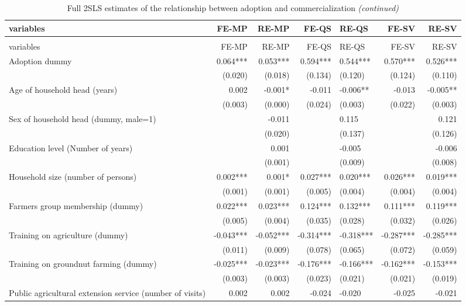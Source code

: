 \documentclass[
]{article}
\begin{document}
\begin{longtable}[t]{lrrrlrr}
\caption{\label{tab:unnamed-chunk-8}Full 2SLS estimates of the relationship between adoption and commercialization}\\
\toprule
variables & FE-MP & RE-MP & FE-QS & RE-QS & FE-SV & RE-SV\\
\midrule
\endfirsthead
\caption[]{\label{tab:unnamed-chunk-8}Full 2SLS estimates of the relationship between adoption and commercialization \textit{(continued)}}\\
\toprule
variables & FE-MP & RE-MP & FE-QS & RE-QS & FE-SV & RE-SV\\
\midrule
\endhead

\endfoot
\bottomrule
\endlastfoot
Adoption dummy & 0.064*** & 0.053*** & 0.594*** & 0.544*** & 0.570*** & 0.526***\\
 & (0.020) & (0.018) & (0.134) & (0.120) & (0.124) & (0.110)\\
Age of household head (years) & 0.002 & -0.001* & -0.011 & -0.006** & -0.013 & -0.005**\\
 & (0.003) & (0.000) & (0.024) & (0.003) & (0.022) & (0.003)\\
Sex of household head (dummy, male=1) &  & -0.011 &  & 0.115 &  & 0.121\\
 &  & (0.020) &  & (0.137) &  & (0.126)\\
Education level (Number of years) &  & 0.001 &  & -0.005 &  & -0.006\\
 &  & (0.001) &  & (0.009) &  & (0.008)\\
Household size (number of persons) & 0.002*** & 0.001* & 0.027*** & 0.020*** & 0.026*** & 0.019***\\
 & (0.001) & (0.001) & (0.005) & (0.004) & (0.004) & (0.004)\\
Farmers group membership (dummy) & 0.022*** & 0.023*** & 0.124*** & 0.132*** & 0.111*** & 0.119***\\
 & (0.005) & (0.004) & (0.035) & (0.028) & (0.032) & (0.026)\\
Training on agriculture (dummy) & -0.043*** & -0.052*** & -0.314*** & -0.318*** & -0.287*** & -0.285***\\
 & (0.011) & (0.009) & (0.078) & (0.065) & (0.072) & (0.059)\\
Training on groundnut farming (dummy) & -0.025*** & -0.023*** & -0.176*** & -0.166*** & -0.162*** & -0.153***\\
 & (0.003) & (0.003) & (0.023) & (0.021) & (0.021) & (0.019)\\
Public agricultural extension service (number of visits) & 0.002 & 0.002 & -0.024 & -0.020 & -0.025 & -0.021\\

\end{longtable}
\end{document}
